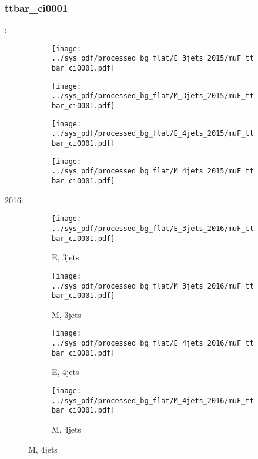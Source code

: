 \documentclass{beamer}
\begin{document}
\begin{frame}
\frametitle{ttbar_ci0001}
\fontsize{5}{1}:
\begin{figure}
\centering
\begin{subfigure}[b]{0.24\textwidth}
\texttt{[image: ../sys\_pdf/processed\_bg\_flat/E\_3jets\_2015/muF\_ttbar\_ci0001.pdf]}
\end{subfigure}
\begin{subfigure}[b]{0.24\textwidth}
\texttt{[image: ../sys\_pdf/processed\_bg\_flat/M\_3jets\_2015/muF\_ttbar\_ci0001.pdf]}
\end{subfigure}
\begin{subfigure}[b]{0.24\textwidth}
\texttt{[image: ../sys\_pdf/processed\_bg\_flat/E\_4jets\_2015/muF\_ttbar\_ci0001.pdf]}
\end{subfigure}
\begin{subfigure}[b]{0.24\textwidth}
\texttt{[image: ../sys\_pdf/processed\_bg\_flat/M\_4jets\_2015/muF\_ttbar\_ci0001.pdf]}
\end{subfigure}
\end{figure}
2016:
\begin{figure}
\centering
\begin{subfigure}[b]{0.24\textwidth}
\texttt{[image: ../sys\_pdf/processed\_bg\_flat/E\_3jets\_2016/muF\_ttbar\_ci0001.pdf]}
\captionsetup{font=tiny}
\caption{E, 3jets}
\end{subfigure}
\begin{subfigure}[b]{0.24\textwidth}
\texttt{[image: ../sys\_pdf/processed\_bg\_flat/M\_3jets\_2016/muF\_ttbar\_ci0001.pdf]}
\captionsetup{font=tiny}
\caption{M, 3jets}
\end{subfigure}
\begin{subfigure}[b]{0.24\textwidth}
\texttt{[image: ../sys\_pdf/processed\_bg\_flat/E\_4jets\_2016/muF\_ttbar\_ci0001.pdf]}
\captionsetup{font=tiny}
\caption{E, 4jets}
\end{subfigure}
\begin{subfigure}[b]{0.24\textwidth}
\texttt{[image: ../sys\_pdf/processed\_bg\_flat/M\_4jets\_2016/muF\_ttbar\_ci0001.pdf]}
\captionsetup{font=tiny}
\caption{M, 4jets}
\end{subfigure}
\end{figure}
\end{frame}
\end{document}
